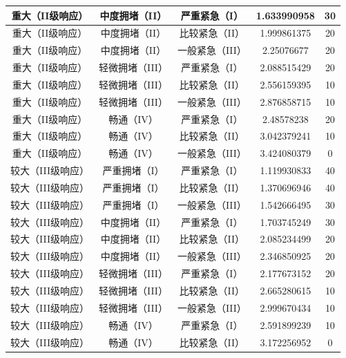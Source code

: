 \begin{center}
\begin{longtable}{|c|c|c|c|c|}
		重大（II级响应）  &   中度拥堵（II） &	 严重紧急（I）	 &  1.633990958	     & 30  \\ \hline
		重大（II级响应）  &   中度拥堵（II） &	 比较紧急（II）    &  	1.999861375	 & 20  \\ \hline
		重大（II级响应）  &   中度拥堵（II） &	 一般紧急（III）   &  	2.25076677	 & 20  \\ \hline
		重大（II级响应）  &   轻微拥堵（III）&	 严重紧急（I）     &  	2.088515429	 & 20  \\ \hline
		重大（II级响应）  &   轻微拥堵（III）&	 比较紧急（II）    &  	2.556159395	 & 10  \\ \hline
		重大（II级响应）  &   轻微拥堵（III）&	 一般紧急（III）   & 	2.876858715	     & 10  \\ \hline
		重大（II级响应）  &   畅通（IV）     &	  严重紧急（I）	   &   2.48578238      & 20  \\ \hline
		重大（II级响应）  &   畅通（IV）     &	  比较紧急（II）	   &    3.042379241    & 10  \\ \hline
		重大（II级响应）  &   畅通（IV）     &	  一般紧急（III）    &  	  3.424080379  & 0   \\ \hline
		较大（III级响应） &  严重拥堵（I）   &   严重紧急（I）	      &      1.119930833 & 40  \\ \hline
		较大（III级响应） &  严重拥堵（I）   &   比较紧急（II）      &  	1.370696946	 & 40  \\ \hline
		较大（III级响应） &  严重拥堵（I）   &   一般紧急（III）     &  	1.542666495	 & 30  \\ \hline
		较大（III级响应） &  中度拥堵（II）  & 	严重紧急（I）	      &      1.703745249 & 30  \\ \hline
		较大（III级响应） &  中度拥堵（II）  & 	比较紧急（II）      &  	2.085234499	 & 20  \\ \hline
		较大（III级响应） &  中度拥堵（II）  & 	一般紧急（III）     & 	2.346850925	 & 20  \\ \hline
		较大（III级响应） &  轻微拥堵（III） &	严重紧急（I）	      &      2.177673152 & 20  \\ \hline
		较大（III级响应） &  轻微拥堵（III） &	比较紧急（II）      &  	2.665280615	 & 10  \\ \hline
		较大（III级响应） &  轻微拥堵（III） &	一般紧急（III）     &  	2.999670434	 & 10  \\ \hline
		较大（III级响应） &  畅通（IV）      &	 严重紧急（I）	    &  2.591899239     & 10  \\ \hline
		较大（III级响应） &  畅通（IV）      &	 比较紧急（II）	    &   3.172256952    & 0   \\ \hline

\end{longtable}
\end{center}

